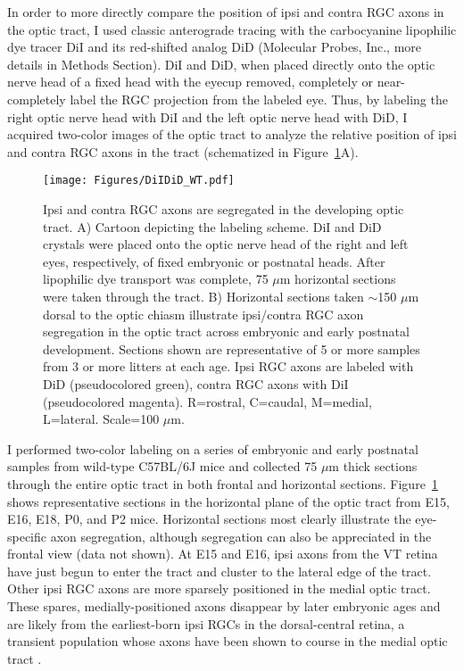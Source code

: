 \label{sec:DiIDiDWT}
In order to more directly compare the position of ipsi and contra RGC axons in the optic tract, I used classic anterograde tracing with the carbocyanine lipophilic dye tracer DiI and its red-shifted analog DiD (Molecular Probes, Inc., more details in Methods Section).
DiI and DiD, when placed directly onto the optic nerve head of a fixed head with the eyecup removed, completely or near-completely label the RGC projection from the labeled eye.
Thus, by labeling the right optic nerve head with DiI and the left optic nerve head with DiD, I acquired two-color images of the optic tract to analyze the relative position of ipsi and contra RGC axons in the tract (schematized in Figure~\ref{Figures/DiIDiDWT}A).

\begin{figure}[hbtp]
    \begin{center}
        \texttt{[image: Figures/DiIDiD\_WT.pdf]}
        \caption[Ipsi and contra RGC axons are segregated in the developing optic tract.]
        {Ipsi and contra RGC axons are segregated in the developing optic tract.
        A) Cartoon depicting the labeling scheme.
        DiI and DiD crystals were placed onto the optic nerve head of the right and left eyes, respectively, of fixed embryonic or postnatal heads.
        After lipophilic dye transport was complete, 75 $\mu$m horizontal sections were taken through the tract.
        B) Horizontal sections taken $\sim$150 $\mu$m dorsal to the optic chiasm illustrate ipsi/contra RGC axon segregation in the optic tract across embryonic and early postnatal development.
        Sections shown are representative of 5 or more samples from 3 or more litters at each age.
		Ipsi RGC axons are labeled with DiD (pseudocolored green), contra RGC axons with DiI (pseudocolored magenta).
        R=rostral, C=caudal, M=medial, L=lateral.
		Scale=100 $\mu$m.}
        \label{Figures/DiIDiDWT}
    \end{center}
\end{figure}

I performed two-color labeling on a series of embryonic and early postnatal samples from wild-type C57BL/6J mice and collected 75 $\mu$m thick sections through the entire optic tract in both frontal and horizontal sections.
Figure~\ref{Figures/DiIDiDWT} shows representative sections in the horizontal plane of the optic tract from E15, E16, E18, P0, and P2 mice.
Horizontal sections most clearly illustrate the eye-specific axon segregation, although segregation can also be appreciated in the frontal view (data not shown).
At E15 and E16, ipsi axons from the VT retina have just begun to enter the tract and cluster to the lateral edge of the tract.
Other ipsi RGC axons are more sparsely positioned in the medial optic tract.
These spares, medially-positioned axons disappear by later embryonic ages and are likely from the earliest-born ipsi RGCs in the dorsal-central retina, a transient population \cite{drager1985birth} whose axons have been shown to course in the medial optic tract \cite{soares2015transient}.

